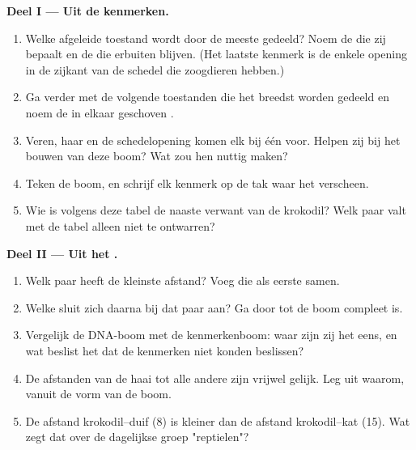 \begin{problem}
\medskip
\noindent\textbf{Deel I --- Uit de kenmerken.}
\begin{enumerate}
  \item Welke afgeleide toestand wordt door de meeste  gedeeld?
        Noem de  die zij bepaalt en de  die erbuiten blijven.
        (Het laatste kenmerk is de enkele opening in de zijkant van de
        schedel die zoogdieren hebben.)
  \item Ga verder met de volgende toestanden die het breedst worden
        gedeeld en noem de in elkaar geschoven .
  \item Veren, haar en de schedelopening komen elk bij één  voor.
        Helpen zij bij het bouwen van deze boom? Wat zou hen nuttig maken?
  \item Teken de boom, en schrijf elk kenmerk op de tak waar het
        verscheen.
  \item Wie is volgens deze tabel de naaste verwant van de krokodil?
        Welk paar valt met de tabel alleen niet te ontwarren?
\end{enumerate}

\medskip
\noindent\textbf{Deel II --- Uit het .}
\begin{enumerate}[resume]
  \item Welk paar  heeft de kleinste afstand? Voeg die als eerste
        samen.
  \item Welke  sluit zich daarna bij dat paar aan? Ga door tot de
        boom compleet is.
  \item Vergelijk de DNA-boom met de kenmerkenboom: waar zijn zij het
        eens, en wat beslist het  dat de kenmerken niet konden
        beslissen?
  \item De afstanden van de haai tot alle andere zijn vrijwel gelijk. Leg
        uit waarom, vanuit de vorm van de boom.
  \item De afstand krokodil--duif (8) is kleiner dan de afstand
        krokodil--kat (15). Wat zegt dat over de dagelijkse groep
        "reptielen"?
\end{enumerate}


\end{problem}
